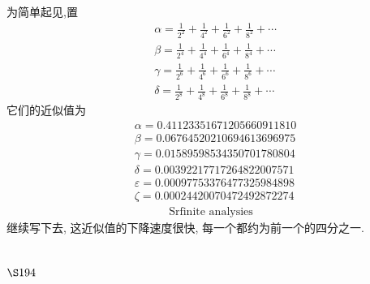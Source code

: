 为简单起见,置
\[
\begin{aligned}
& \alpha=\frac{1}{2^{2}}+\frac{1}{4^{2}}+\frac{1}{6^{2}}+\frac{1}{8^{2}}+\cdots \\
& \beta=\frac{1}{2^{4}}+\frac{1}{4^{4}}+\frac{1}{6^{4}}+\frac{1}{8^{4}}+\cdots \\
& \gamma=\frac{1}{2^{6}}+\frac{1}{4^{6}}+\frac{1}{6^{6}}+\frac{1}{8^{6}}+\cdots \\
& \delta=\frac{1}{2^{8}}+\frac{1}{4^{8}}+\frac{1}{6^{8}}+\frac{1}{8^{8}}+\cdots
\end{aligned}
\]
它们的近似值为
\[
\begin{aligned}
& \alpha=0.41123351671205660911810 \\
& \beta=0.06764520210694613696975 \\
& \gamma=0.01589598534350701780804 \\
& \delta=0.00392217717264822007571 \\
& \varepsilon=0.00097753376477325984898 \\
& \zeta=0.00024420070472492872274 
\end{aligned}
\]
\[
\begin{aligned}
\text { Srfinite analysies }
\end{aligned}
\]
继续写下去, 这近似值的下降速度很快, 每一个都约为前一个的四分之一.

\section{$\S 194$}

